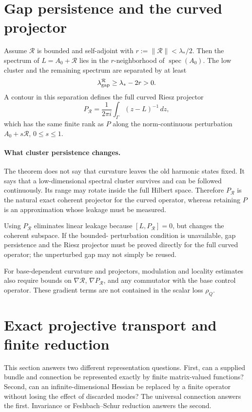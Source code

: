 \documentclass[11pt]{article}
\begin{document}
\section{Gap persistence and the curved projector}

\begin{theorem}\label{thm:gap}
Assume $\mathcal R$ is bounded and self-adjoint with
$r:=\|\mathcal R\|<\lambda_\ast/2$. Then the spectrum of
$L=A_0+\mathcal R$ lies in the $r$-neighborhood of
$\operatorname{spec}(A_0)$. The low cluster and the remaining spectrum are
separated by at least
\[
\lambda_{\rm gap}^{\mathcal R}\ge\lambda_\ast-2r>0.
\]
A contour in this separation defines the full curved Riesz projector
\[
P_{\mathcal R}=\frac{1}{2\pi i}\int_\Gamma(z-L)^{-1}\,dz,
\]
which has the same finite rank as $P$ along the norm-continuous perturbation
$A_0+s\mathcal R$, $0\le s\le1$.
\end{theorem}

\paragraph{What cluster persistence changes.}
The theorem does not say that curvature leaves the old harmonic states fixed.
It says that a low-dimensional spectral cluster survives and can be followed
continuously.  Its range may rotate inside the full Hilbert space.  Therefore
$P_{\mathcal R}$ is the natural exact coherent projector for the curved
operator, whereas retaining $P$ is an approximation whose leakage must be
measured.

Using $P_{\mathcal R}$ eliminates linear leakage because
$[L,P_{\mathcal R}]=0$, but changes the coherent subspace. If the bounded-
perturbation condition is unavailable, gap persistence and the Riesz projector
must be proved directly for the full curved operator; the unperturbed gap may
not simply be reused.

For base-dependent curvature and projectors, modulation and locality estimates
also require bounds on $\nabla\mathcal R$, $\nabla P_{\mathcal R}$, and any
commutator with the base control operator. These gradient terms are not
contained in the scalar loss $\rho_Q$.

\section{Exact projective transport and finite reduction}

This section answers two different representation questions.  First, can a
supplied bundle and connection be represented exactly by finite matrix-valued
functions?  Second, can an infinite-dimensional Hessian be replaced by a
finite operator without losing the effect of discarded modes?  The universal
connection answers the first.  Invariance or Feshbach--Schur reduction answers
the second.
\end{document}

